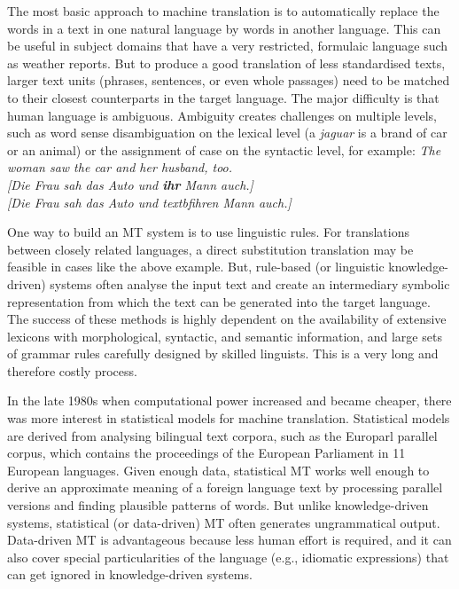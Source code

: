 \documentclass[]{../metanetpaper}
\begin{document}
\begin{Parallel}[c]{80mm}{80mm}
{    The most basic approach to machine translation is to automatically replace the words in a text in one natural language by words in another language. This can be useful in subject domains that have a very restricted, formulaic language such as weather reports. But to produce a good translation of less standardised texts, larger text units (phrases, sentences, or even whole passages) need to be matched to their closest counterparts in the target language. The major difficulty is that human language is ambiguous. Ambiguity creates challenges on multiple levels, such as word sense disambiguation on the lexical level (a \textit{jaguar} is a brand of car or an animal) or the assignment of case on the syntactic level, for example:
    \textit{The woman saw the car and her husband, too.\\
      {[}Die Frau sah das Auto und \textbf{ihr} Mann auch.{]}\\
      {[}Die Frau sah das Auto und textbf{ihren} Mann auch.{]} }

    One way to build an MT system is to use linguistic rules. For translations between closely related languages, a direct substitution translation may be feasible in cases like the above example. But, rule-based (or linguistic knowledge-driven) systems often analyse the input text and create an intermediary symbolic representation from which the text can be generated into the target language. The success of these methods is highly dependent on the availability of extensive lexicons with morphological, syntactic, and semantic information, and large sets of grammar rules carefully designed by skilled linguists. This is a very long and therefore costly process.

    In the late 1980s when computational power increased and became cheaper, there was more interest in statistical models for machine translation. Statistical models are derived from analysing bilingual text corpora, such as the Europarl parallel corpus, which contains the proceedings of the European Parliament in 11 European languages. Given enough data, statistical MT works well enough to derive an approximate meaning of a foreign language text by processing parallel versions and finding plausible patterns of words. But unlike knowledge-driven systems, statistical (or data-driven) MT often generates ungrammatical output. Data-driven MT is advantageous because less human effort is required, and it can also cover special particularities of the language (e.g., idiomatic expressions) that can get ignored in knowledge-driven systems. 

}
\end{Parallel}
\end{document}
